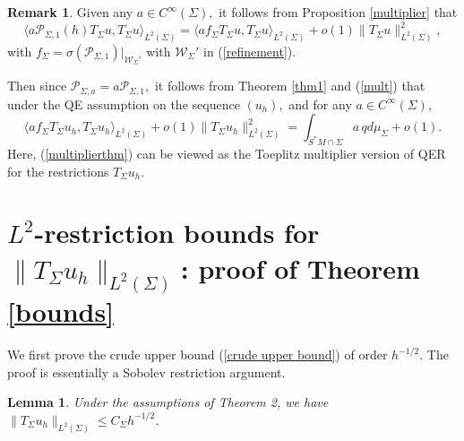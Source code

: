 \documentclass[11pt,reqno]{amsart}
\newtheorem{lemma}[theorem]{Lemma}
\theoremstyle{definition}
\newtheorem{remark}{Remark}
\begin{document}
 \begin{remark} \label{multiplierQER}
Given any $a \in C^{\infty}(\Sigma),$ it follows from Proposition \ref{multiplier} that 
 \begin{equation} \label{mult}
 \langle a {\mathcal P}_{\Sigma,1}(h) T_{\Sigma} u, T_{\Sigma} u \rangle_{L^2(\Sigma)} =  \langle a f_{\Sigma} T_{\Sigma} u, T_{\Sigma} u \rangle_{L^2(\Sigma)}  + o(1) \| T_{\Sigma} u \|^2_{L^2(\Sigma)},
 \end{equation}
 with $f_{\Sigma} = \sigma({\mathcal P}_{\Sigma,1}) |_{{\mathcal W}_{\Sigma}'}$ with ${\mathcal W}_{\Sigma}'$ in (\ref{refinement}).
 
  Then since ${\mathcal P}_{\Sigma,a} = a {\mathcal P}_{\Sigma,1},$ it follows from Theorem \ref{thm1} and (\ref{mult})  that under the QE  assumption on the sequence $(u_h),$ and  for any $a \in C^{\infty}(\Sigma),$ 
  \begin{equation} \label{multiplierthm}
\langle a f_{\Sigma} T_{\Sigma} u_h, T_{\Sigma}u_h \rangle_{L^2(\Sigma)}  + o(1) \| T_{\Sigma} u_h \|_{L^2(\Sigma)}^2 = \int_{S^*M \cap \Sigma}  a  \, q  d\mu_{\Sigma} + o(1).
\end{equation}
Here, (\ref{multiplierthm}) can be viewed as  the  Toeplitz multiplier version of QER for the restrictions $T_{\Sigma} u_h.$ 
\end{remark} 




\section{ $L^2$-restriction bounds for $\| T_{\Sigma} u_h \|_{L^2(\Sigma)}$: proof of Theorem \ref{bounds}}\label{UL}


We first prove the crude upper bound (\ref{crude upper bound}) of order $h^{-1/2}$. The proof is essentially a Sobolev restriction argument.\




\begin{lemma}\label{lemma of crude}
    Under the assumptions of Theorem 2, we have $\|T_{\Sigma}u_h\|_{L^2(\Sigma)}\leq C_{\Sigma}h^{-1/2}$. 
\end{lemma}
\end{document}
